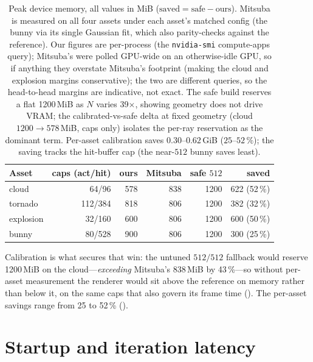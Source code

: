 \begin{table}[htp]
  \centering
  \begin{tabular}{@{}lrrrrr@{}}
    \toprule
    Asset & caps (act/hit) & ours & Mitsuba & safe \(512\) & saved \\
    \midrule
    cloud     & 64/96   & 578 & 838 & 1200 & 622 (52\,\%) \\
    tornado   & 112/384 & 818 & 806 & 1200 & 382 (32\,\%) \\
    explosion & 32/160  & 600 & 806 & 1200 & 600 (50\,\%) \\
    bunny     & 80/528  & 900 & 806 & 1200 & 300 (25\,\%) \\
    \bottomrule
  \end{tabular}
  \caption{Peak device memory, all values in MiB (\(\text{saved}=\text{safe}-\text{ours}\)). Mitsuba is
  measured on all four assets under each asset's matched config (the bunny via its single Gaussian fit,
  which  also parity-checks against the reference). Our figures are per-process (the \texttt{nvidia-smi} compute-apps query); Mitsuba's were
  polled GPU-wide on an otherwise-idle GPU, so if anything they overstate Mitsuba's footprint (making the
  cloud and explosion margins conservative); the two are different queries, so the head-to-head margins
  are indicative, not exact. The safe build reserves a flat 1200\,MiB as $N$ varies \num{39}$\times$,
  showing geometry does not drive VRAM; the calibrated-vs-safe delta at fixed geometry
  (cloud $1200\to578\,$MiB, caps only) isolates the per-ray reservation as the dominant term. Per-asset
  calibration saves $0.30$--$0.62\,$GiB ($25$--$52\,\%$); the saving tracks the hit-buffer cap (the
  near-\(512\) bunny saves least).}
  \label{tab:vram}
\end{table}

Calibration is what secures that win: the untuned \(512/512\) fallback would reserve 1200\,MiB on the
cloud---\emph{exceeding} Mitsuba's 838\,MiB by \num{43}\,\%---so without per-asset measurement the
renderer would sit above the reference on memory rather than below it, on the same caps that also govern
its frame time (). The per-asset savings range from \num{25} to \num{52}\,\%
().

\section{Startup and iteration latency}
\label{sec:results-startup}

